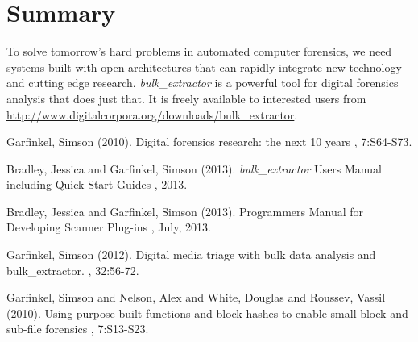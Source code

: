 \documentclass[DIV=calc, paper=a4, fontsize=11pt]{article}	 %
\newcommand \bulk {\textit{bulk\_extractor}\xspace}
\begin{document}
\section*{Summary}
 To solve tomorrow's hard problems in automated computer forensics, we need systems built with open architectures that can rapidly integrate new technology and cutting edge research. \bulk is a powerful tool for digital forensics analysis that does just that.  It is freely available to interested users from \url{http://www.digitalcorpora.org/downloads/bulk_extractor}. 


\begin{thebibliography}{99} %

Garfinkel, Simson (2010).
\newblock Digital forensics research: the next 10 years
, 7:S64-S73.

Bradley, Jessica and Garfinkel, Simson (2013).
\newblock \bulk Users Manual including Quick Start Guides
, 2013.

Bradley, Jessica and Garfinkel, Simson (2013).
\newblock Programmers Manual for Developing Scanner Plug-ins
, July, 2013.	

Garfinkel, Simson (2012).
\newblock Digital media triage with bulk data analysis and bulk\_extractor. 
, 32:56-72.

Garfinkel, Simson and Nelson, Alex and White, Douglas and Roussev, Vassil (2010).
\newblock Using purpose-built functions and block hashes to enable small block and sub-file forensics
, 7:S13-S23.

\end{thebibliography}

\end{document}
